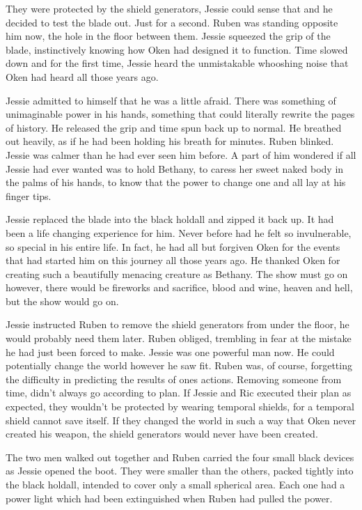 They were protected by the shield generators, Jessie could sense that and he decided to test the blade out.  Just for a second.  Ruben was standing opposite him now, the hole in the floor between them.  Jessie squeezed the grip of the blade, instinctively knowing how Oken had designed it to function.  Time slowed down and for the first time, Jessie heard the unmistakable whooshing noise that Oken had heard all those years ago.  

Jessie admitted to himself that he was a little afraid.  There was something of unimaginable power in his hands, something that could literally rewrite the pages of history.  He released the grip and time spun back up to normal.  He breathed out heavily, as if he had been holding his breath for minutes.  Ruben blinked.  Jessie was calmer than he had ever seen him before.  A part of him wondered if all Jessie had ever wanted was to hold Bethany, to caress her sweet naked body in the palms of his hands, to know that the power to change one and all lay at his finger tips.  

Jessie replaced the blade into the black holdall and zipped it back up.  It had been a life changing experience for him.  Never before had he felt so invulnerable, so special in his entire life.  In fact, he had all but forgiven Oken for the events that had started him on this journey all those years ago.  He thanked Oken for creating such a beautifully menacing creature as Bethany.  The show must go on however, there would be fireworks and sacrifice, blood and wine, heaven and hell, but the show would go on. 

Jessie instructed Ruben to remove the shield generators from under the floor, he would probably need them later.  Ruben obliged, trembling in fear at the mistake he had just been forced to make.  Jessie was one powerful man now.  He could potentially change the world however he saw fit.  Ruben was, of course, forgetting the difficulty in predicting the results of ones actions.  Removing someone from time, didn't always go according to plan.  If Jessie and Ric executed their plan as expected, they wouldn't be protected by wearing temporal shields, for a temporal shield cannot save itself.  If they changed the world in such a way that Oken never created his weapon, the shield generators would never have been created.

The two men walked out together and Ruben carried the four small black devices as Jessie opened the boot.  They were smaller than the others, packed tightly into the black holdall, intended to cover only a small spherical area.  Each one had a power light which had been extinguished when Ruben had pulled the power.

